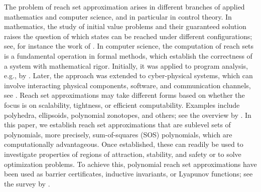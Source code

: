 \documentclass[pmlr]{jmlr}%
\begin{document}

The problem of reach set approximation arises in different branches of applied mathematics and computer science, and in particular in control theory. In mathematics, the study of initial value problems and their guaranteed solution raises the question of which states can be reached under different configurations; see, for instance the work of \cite{BerzM98}. In computer science, the computation of reach sets is a fundamental operation in formal methods, which establish the correctness of a system with mathematical rigor. Initially, it was applied to program analysis, e.g., by \cite{halbwachs94b}. Later, the approach was extended to cyber-physical systems, which can involve interacting physical components, software, and communication channels, see \cite{alur2015principles}.
%
Reach set approximations may take different forms based on whether the focus is on scalability, tightness, or efficient computability. Examples include polyhedra, ellipsoids, polynomial zonotopes, and others; see the overview by \cite{althoff2021set}.
%
In this paper, we establish reach set approximations that are sublevel sets of polynomials, more precisely, sum-of-squares (SOS) polynomials, which are computationally advantageous. Once established, these can readily be used to investigate properties of regions of attraction, stability, and safety or to solve optimization problems. To achieve this, polynomial reach set approximations have been used as barrier certificates, inductive invariants, or Lyapunov functions; see the survey by \cite{doyen2018handbook}. 
\end{document}
